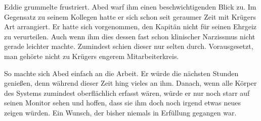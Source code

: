 Eddie grummelte frustriert. Abed warf ihm einen beschwichtigenden Blick zu. Im Gegensatz zu seinem Kollegen hatte er sich schon seit geraumer Zeit mit Krügers Art arrangiert. Er hatte sich vorgenommen, den Kapitän nicht für seinen Ehrgeiz zu verurteilen. Auch wenn ihm dies dessen fast schon klinischer Narzissmus nicht gerade leichter machte. Zumindest schien dieser nur selten durch. Vorausgesetzt, man gehörte nicht zu Krügers engerem Mitarbeiterkreis.

\par

So machte sich Abed einfach an die Arbeit. Er würde die nächsten Stunden genießen, denn während dieser Zeit hing vieles an ihm. Danach, wenn alle Körper des Systems zumindest oberflächlich erfasst wären, würde er nur noch starr auf seinen Monitor sehen und hoffen, dass sie ihm doch noch irgend etwas neues zeigen würden. Ein Wunsch, der bisher niemals in Erfüllung gegangen war.